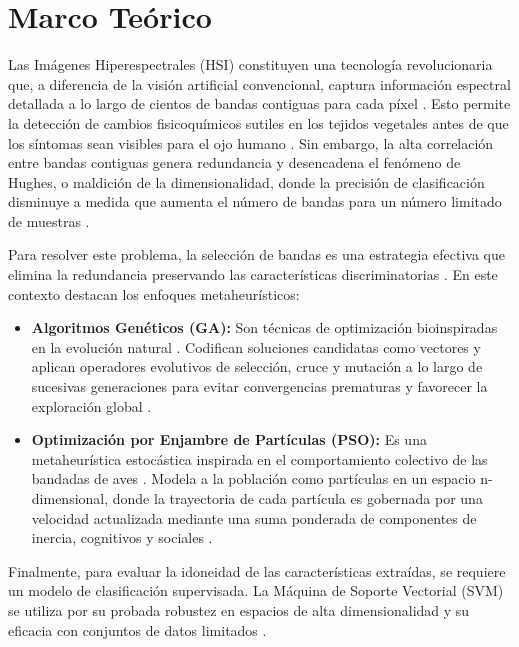 \chapter{Marco Teórico}

Las Imágenes Hiperespectrales (HSI) constituyen una tecnología revolucionaria que, a diferencia de la visión artificial convencional, captura información espectral detallada a lo largo de cientos de bandas contiguas para cada píxel \cite{wang_review_2021, chu_classifying_2020}. Esto permite la detección de cambios fisicoquímicos sutiles en los tejidos vegetales antes de que los síntomas sean visibles para el ojo humano \cite{wang_review_2021, chu_classifying_2020}. Sin embargo, la alta correlación entre bandas contiguas genera redundancia y desencadena el fenómeno de Hughes, o maldición de la dimensionalidad, donde la precisión de clasificación disminuye a medida que aumenta el número de bandas para un número limitado de muestras \cite{hughes_mean_1968, sawant_survey_2020}.

Para resolver este problema, la selección de bandas es una estrategia efectiva que elimina la redundancia preservando las características discriminatorias \cite{sawant_survey_2020}. En este contexto destacan los enfoques metaheurísticos:
\begin{itemize}
    \item \textbf{Algoritmos Genéticos (GA):} Son técnicas de optimización bioinspiradas en la evolución natural \cite{eiben_introduction_2015}. Codifican soluciones candidatas como vectores y aplican operadores evolutivos de selección, cruce y mutación a lo largo de sucesivas generaciones para evitar convergencias prematuras y favorecer la exploración global \cite{deb_multi-objective_2001, eiben_introduction_2015}.
    \item \textbf{Optimización por Enjambre de Partículas (PSO):} Es una metaheurística estocástica inspirada en el comportamiento colectivo de las bandadas de aves \cite{eiben_introduction_2015}. Modela a la población como partículas en un espacio n-dimensional, donde la trayectoria de cada partícula es gobernada por una velocidad actualizada mediante una suma ponderada de componentes de inercia, cognitivos y sociales \cite{eiben_introduction_2015, ratnaweera_self-organizing_2004}.
\end{itemize}

Finalmente, para evaluar la idoneidad de las características extraídas, se requiere un modelo de clasificación supervisada. La Máquina de Soporte Vectorial (SVM) se utiliza por su probada robustez en espacios de alta dimensionalidad y su eficacia con conjuntos de datos limitados \cite{nagasubramanian_hyperspectral_2018}.
